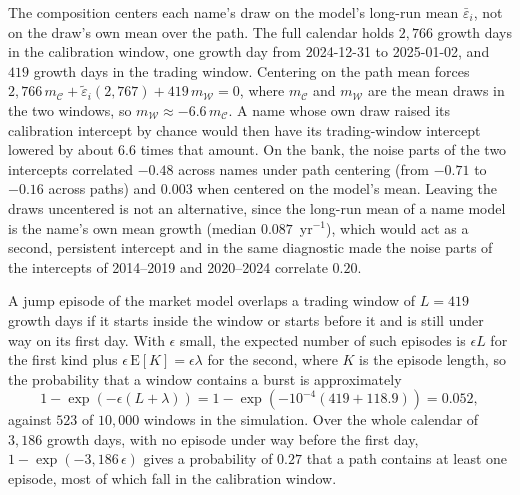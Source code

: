 The composition centers each name's draw on the model's long-run mean $\bar\varepsilon_i$, not on the draw's own mean
over the path. The full calendar holds $2{,}766$ growth days in the calibration window, one growth day from
2024-12-31 to 2025-01-02, and $419$ growth days in the trading window. Centering on the path mean forces
$2{,}766\, m_{\mathcal{C}} + \tilde\varepsilon_i(2{,}767) + 419\, m_{\mathcal{W}} = 0$, where $m_{\mathcal{C}}$ and
$m_{\mathcal{W}}$ are the mean draws in the two windows, so $m_{\mathcal{W}} \approx -6.6\, m_{\mathcal{C}}$. A name
whose own draw raised its calibration intercept by chance would then have its trading-window intercept lowered by
about $6.6$ times that amount. On the bank, the noise parts of the two intercepts correlated $-0.48$ across names under
path centering (from $-0.71$ to $-0.16$ across paths) and $0.003$ when centered on the model's mean. Leaving the draws
uncentered is not an alternative, since the long-run mean of a name model is the name's own mean growth (median
$0.087$~yr$^{-1}$), which would act as a second, persistent intercept and in the same diagnostic made the noise parts
of the intercepts of 2014--2019 and 2020--2024 correlate $0.20$.

A jump episode of the market model overlaps a trading window of $L = 419$ growth days if it starts inside the window
or starts before it and is still under way on its first day. With $\epsilon$ small, the expected number of such
episodes is $\epsilon L$ for the first kind plus $\epsilon\, \mathrm{E}[K] = \epsilon\lambda$ for the second, where
$K$ is the episode length, so the probability that a window contains a burst is approximately
\begin{equation}
  1 - \exp\left(-\epsilon (L + \lambda)\right) = 1 - \exp\left(-10^{-4} (419 + 118.9)\right) = 0.052,
  \label{eq:burst-prob}
\end{equation}
against $523$ of $10{,}000$ windows in the simulation. Over the whole calendar of $3{,}186$ growth days, with no
episode under way before the first day, $1 - \exp(-3{,}186\,\epsilon)$ gives a probability of $0.27$ that a path contains at least one episode, most of which fall in the
calibration window.

